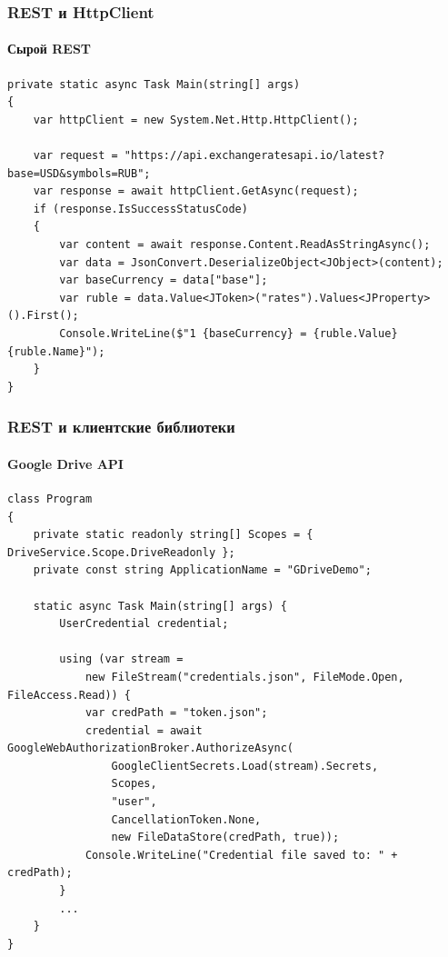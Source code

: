 \documentclass{../../slides-style}
\begin{document}
    \begin{frame}[fragile]
        \frametitle{REST и HttpClient}
        \framesubtitle{Сырой REST}
        \begin{footnotesize}
            \begin{verbatim}
private static async Task Main(string[] args)
{
    var httpClient = new System.Net.Http.HttpClient();

    var request = "https://api.exchangeratesapi.io/latest?base=USD&symbols=RUB";
    var response = await httpClient.GetAsync(request);
    if (response.IsSuccessStatusCode)
    {
        var content = await response.Content.ReadAsStringAsync();
        var data = JsonConvert.DeserializeObject<JObject>(content);
        var baseCurrency = data["base"];
        var ruble = data.Value<JToken>("rates").Values<JProperty>().First();
        Console.WriteLine($"1 {baseCurrency} = {ruble.Value} {ruble.Name}");
    }
}
            \end{verbatim}
        \end{footnotesize}
    \end{frame}

    \begin{frame}[fragile]
        \frametitle{REST и клиентские библиотеки}
        \framesubtitle{Google Drive API}
        \begin{scriptsize}
            \begin{verbatim}
class Program
{
    private static readonly string[] Scopes = { DriveService.Scope.DriveReadonly };
    private const string ApplicationName = "GDriveDemo";

    static async Task Main(string[] args) {
        UserCredential credential;

        using (var stream =
            new FileStream("credentials.json", FileMode.Open, FileAccess.Read)) {
            var credPath = "token.json";
            credential = await GoogleWebAuthorizationBroker.AuthorizeAsync(
                GoogleClientSecrets.Load(stream).Secrets,
                Scopes,
                "user",
                CancellationToken.None,
                new FileDataStore(credPath, true));
            Console.WriteLine("Credential file saved to: " + credPath);
        }
        ...
    }
}
            \end{verbatim}
        \end{scriptsize}
    \end{frame}
\end{document}

